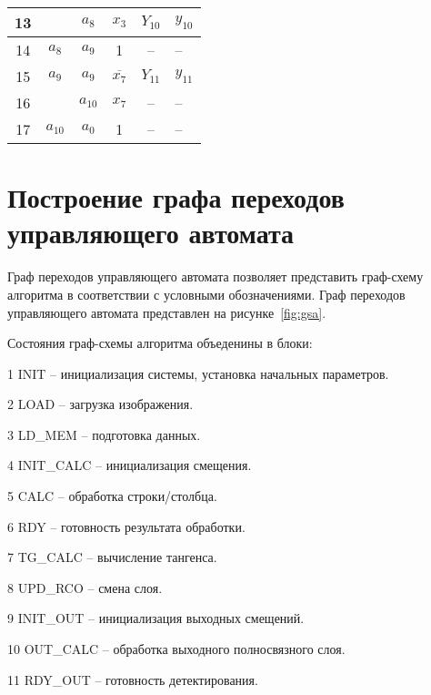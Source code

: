\begin{table*}[ht]
\begin{tabularx}{\textwidth}{|c|c|c|c|c|>{\centering\arraybackslash}X|}
    13 &          & $a_8$    & $x_3$               & $Y_{10}$                                  & $y_{10}$                               \\ \hline
    14 & $a_8$    & $a_9$    &  1                  &  –                                        &   –                                    \\ \hline
    15 & $a_9$    & $a_9$    & $\overline{x_7}$    & $Y_{11}$                                  & $y_{11}$                               \\ \hline
    16 &          & $a_{10}$ & $x_7$               &  –                                        &   –                                    \\ \hline
    17 & $a_{10}$ & $a_0$    &  1                  &  –                                        &   –                                    \\ \hline
  \end{tabularx}
\end{table*}

\section{Построение графа переходов управляющего автомата}

\hspace*{12.5 mm}Граф переходов управляющего автомата позволяет представить 
граф-схему алгоритма в соответствии с условными обозначениями. Граф переходов 
управляющего автомата представлен на рисунке~\ref{fig:gsa}.

Состояния граф-схемы алгоритма объеденины в блоки:

  1 {INIT} – инициализация системы, установка начальных параметров.

  2 {LOAD} – загрузка изображения.

  3 {LD\_MEM} – подготовка данных.

  4 {INIT\_CALC} – инициализация смещения.

  5 {CALC} – обработка строки/столбца.

  6 {RDY} – готовность результата обработки.

  7 {TG\_CALC} – вычисление тангенса.

  8 {UPD\_RCO} – смена слоя.

  9 {INIT\_OUT} – инициализация выходных смещений.

  10 {OUT\_CALC} – обработка выходного полносвязного слоя.

  11 {RDY\_OUT} – готовность детектирования.

